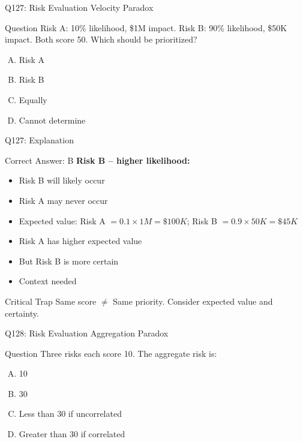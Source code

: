 \documentclass{beamer}
\begin{document}
	\begin{frame}{Q127: Risk Evaluation Velocity Paradox}
		\begin{block}{Question}
			Risk A: 10\% likelihood, \$1M impact. Risk B: 90\% likelihood, \$50K impact. Both score 50. Which should be prioritized?
		\end{block}
		\begin{enumerate}[(A)]
			\item Risk A
			\item Risk B
			\item Equally
			\item Cannot determine
		\end{enumerate}
	\end{frame}
	
	\begin{frame}{Q127: Explanation}
		\begin{block}{Correct Answer: B}
			\textbf{Risk B -- higher likelihood:}
			\begin{itemize}
				\item Risk B will likely occur
				\item Risk A may never occur
				\item Expected value: Risk A $= 0.1 \times 1M = \$100K$; Risk B $= 0.9 \times 50K = \$45K$
				\item Risk A has higher expected value
				\item But Risk B is more certain
				\item Context needed
			\end{itemize}
		\end{block}
		\begin{alertblock}{Critical Trap}
			Same score $\neq$ Same priority. Consider expected value and certainty.
		\end{alertblock}
	\end{frame}
	
	\begin{frame}{Q128: Risk Evaluation Aggregation Paradox}
		\begin{block}{Question}
			Three risks each score 10. The aggregate risk is:
		\end{block}
		\begin{enumerate}[(A)]
			\item 10
			\item 30
			\item Less than 30 if uncorrelated
			\item Greater than 30 if correlated
		\end{enumerate}
	\end{frame}
	
\end{document}
